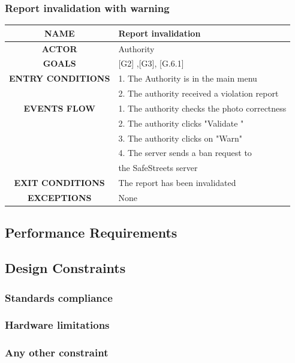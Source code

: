 \documentclass[12pt,a4paper]{article}
\begin{document}
\subsubsection{Report invalidation with warning}
		\begin{center}
			\begin{tabular}{| c | l |}
				\hline
				\textbf{NAME} & Report invalidation \\
				\hline
				\textbf{ACTOR} & Authority \\
				\hline
				\textbf{GOALS} & [G2] ,[G3], [G.6.1] \\
				\hline
				\textbf{ENTRY CONDITIONS} &1. The Authority is in the main menu \\
				&2. The authority received a violation report \\ \hline
				\textbf{EVENTS FLOW}  &
				1. The authority checks the photo correctness\\
				&2. The authority clicks "Validate " \\
				&3. The authority clicks on "Warn"  \\
				&4. The server sends a ban request to \\
				& the SafeStreets server \\
				\hline
				\textbf{EXIT CONDITIONS}  & The report has been invalidated \\ \hline
				\textbf{EXCEPTIONS} & None \\
				\hline
			\end{tabular}
		\end{center}

\subsection{Performance	Requirements} 
\subsection{Design	Constraints}
\subsubsection{Standards	compliance}
\subsubsection{Hardware	limitations}
\subsubsection{Any	other	constraint} 
\end{document}
